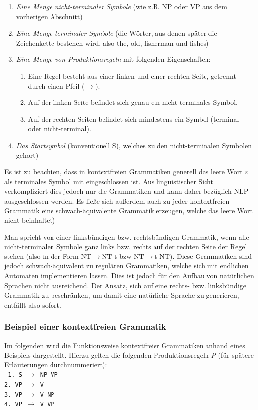 \documentclass[12pt]{report}
\begin{document}
\begin{enumerate}
\item \textit{Eine Menge nicht-terminaler Symbole} (wie z.B. NP oder VP aus dem vorherigen Abschnitt)
\item \textit{Eine Menge terminaler Symbole} (die Wörter, aus denen später die Zeichenkette bestehen wird, also \glqq  the\grqq{}, \glqq  old\grqq{}, \glqq  fisherman\grqq{} und \glqq  fishes\grqq{})
\item \textit{Eine Menge von \glqq Produktionsregeln \grqq{}} mit folgenden Eigenschaften:
\begin{enumerate}
\item Eine Regel besteht aus einer linken und einer rechten Seite, getrennt durch einen Pfeil ($\rightarrow$).
\item Auf der linken Seite befindet sich genau ein nicht-terminales Symbol.
\item Auf der rechten Seiten befindet sich mindestens ein Symbol (terminal oder nicht-terminal).
\end{enumerate}
\item \textit{Das Startsymbol} (konventionell \glqq  S\grqq{}), welches zu den nicht-terminalen Symbolen gehört)
\end{enumerate}

Es ist zu beachten, dass in kontextfreien Grammatiken generell das leere Wort $\varepsilon$ als terminales Symbol mit eingeschlossen ist. Aus linguistischer Sicht verkompliziert dies jedoch nur die Grammatiken und kann daher bezüglich NLP ausgeschlossen werden. Es ließe sich außerdem auch zu jeder kontextfreien Grammatik eine schwach-äquivalente Grammatik erzeugen, welche das leere Wort nicht beinhaltet)

Man spricht von einer linksbündigen bzw. rechtsbündigen Grammatik, wenn alle nicht-terminalen Symbole ganz links bzw. rechts auf der rechten Seite der Regel stehen (also in der Form \glqq  NT$\rightarrow$NT t\grqq{} bzw \glqq  NT$\rightarrow$t NT\grqq{}). Diese Grammatiken sind jedoch schwach-äquivalent zu regulären Grammatiken, welche sich mit endlichen Automaten implementieren lassen. Dies ist jedoch für den Aufbau von natürlichen Sprachen nicht ausreichend. Der Ansatz, sich auf eine rechts- bzw. linksbündige Grammatik zu beschränken, um damit eine natürliche Sprache zu generieren, entfällt also sofort. 

\subsubsection{Beispiel einer kontextfreien Grammatik}
Im folgenden wird die Funktionsweise kontextfreier Grammatiken anhand eines Beispiels dargestellt. Hierzu gelten die folgenden Produktionsregeln \textit{P} (für spätere Erläuterungen durchnummeriert):
\newline
\\
\tt
1. S $\rightarrow$ NP VP\\
2. VP $\rightarrow$ V\\
3. VP $\rightarrow$ V NP\\
4. VP $\rightarrow$ V VP\\
\end{document}
